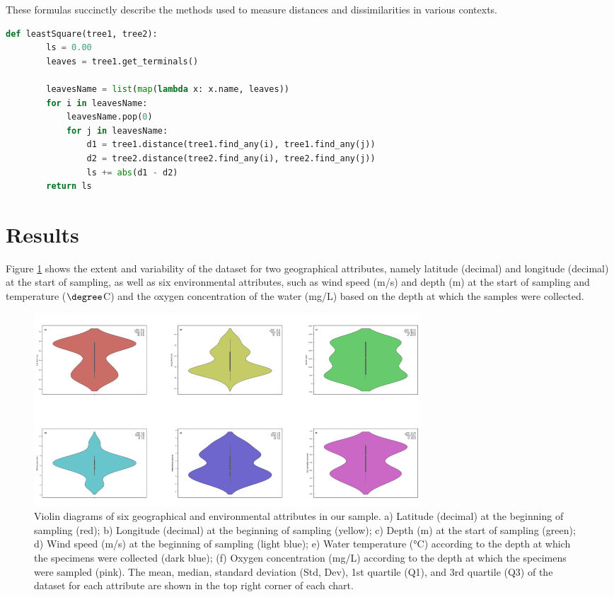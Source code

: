 These formulas succinctly describe the methods used to measure distances and dissimilarities in various contexts.

\begin{lstlisting}[label=lst:LeastSquare,language=Python,caption=Python script for calculating the Least-Square distance using the ete3 package in the aPhyloGeo package]
    def leastSquare(tree1, tree2):
        ls = 0.00
        leaves = tree1.get_terminals()

        leavesName = list(map(lambda x: x.name, leaves))
        for i in leavesName:
            leavesName.pop(0)
            for j in leavesName:
                d1 = tree1.distance(tree1.find_any(i), tree1.find_any(j))
                d2 = tree2.distance(tree2.find_any(i), tree2.find_any(j))
                ls += abs(d1 - d2)
        return ls
\end{lstlisting}

\section{Results}\label{results}

Figure \ref{fig:fig1} shows the extent and variability of the dataset for two geographical attributes, namely latitude (decimal) and longitude (decimal) at the start of sampling, as well as six environmental attributes, such as wind speed (m/s) and depth (m) at the start of sampling and temperature ($\degree$C) and the oxygen concentration of the water (mg/L) based on the depth at which the samples were collected.

\begin{figure}[]
    \centering
    \includegraphics[width=0.7\textwidth]{figure1.jpg}
    \caption{Violin diagrams of six geographical and environmental attributes in our sample. a) Latitude (decimal) at the beginning of sampling (red); b) Longitude (decimal) at the beginning of sampling (yellow); c) Depth (m) at the start of sampling (green); d) Wind speed (m/s) at the beginning of sampling (light blue); e) Water temperature (°C) according to the depth at which the specimens were collected (dark blue); (f) Oxygen concentration (mg/L) according to the depth at which the specimens were sampled (pink). The mean, median, standard deviation (Std, Dev), 1st quartile (Q1), and 3rd quartile (Q3) of the dataset for each attribute are shown in the top right corner of each chart. \label{fig:fig1}}
\end{figure}

